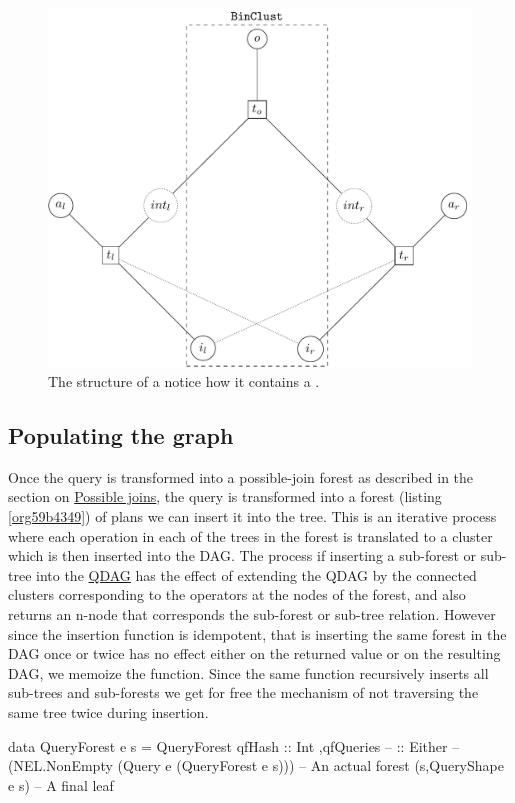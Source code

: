 \begin{figure}[H]
  \centering
  \includegraphics[width=.9\linewidth]{./imgs/joinclust.pdf}
  \caption{\label{fig:orgf1d2858}The structure of a 
    notice how it contains a .}
\end{figure}


\subsection{Populating the graph}
\label{sec:orgf8560ae}
Once the query is transformed into a possible-join forest as described
in the section on \hyperref[sec:org2eb887b]{Possible joins}, the query is transformed into a
forest (listing \ref{org59b4349}) of plans we can insert it into
the tree. This is an iterative process where each operation in each of
the trees in the forest is translated to a cluster which is then
inserted into the DAG. The process if inserting a sub-forest or
sub-tree into the \hyperref[sec:org5a9ec3b]{QDAG} has the effect of extending the QDAG by the
connected clusters corresponding to the operators at the nodes of the
forest, and also returns an n-node that corresponds the sub-forest or
sub-tree relation. However since the insertion function is idempotent,
that is inserting the same forest in the DAG once or twice has no
effect either on the returned value or on the resulting DAG, we
memoize the function. Since the same function recursively inserts all
sub-trees and sub-forests we get for free the mechanism of not
traversing the same tree twice during insertion.

\begin{code}
  \begin{haskellcode}
    data QueryForest e s =
      QueryForest
      { qfHash :: Int
        ,qfQueries --
        :: Either --
        (NEL.NonEmpty (Query e (QueryForest e s))) -- An actual forest
        (s,QueryShape e s) -- A final leaf
      }
  \end{haskellcode}
  \caption{\label{org59b4349}The definition of the query forest. The
    query forest is hashed so that we can avoid traversing the same
    query forest repeatedly. The query forest is essentially a
    non-empty of queries with forests at their leafs.}
\end{code}

